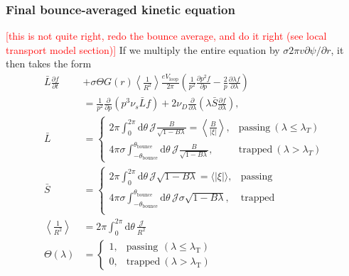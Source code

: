 \documentclass[11pt,a4paper]{article}
\newcommand{\rd}{\ensuremath{\mathrm{d}}}
\newcommand{\sub}[1]{\ensuremath{_{\text{#1}}}}
\begin{document}
\subsubsection*{Final bounce-averaged kinetic equation}
\textcolor{red}{[this is not quite right, redo the bounce average, and do it right (see local transport model section)]} If we multiply the entire equation by $\sigma 2\pi v \partial \psi/\partial r$, it then takes the form
\begin{align}
\bar{L}\frac{\partial f}{\partial t} &+ \sigma\Theta G(r) \left\langle\frac{1}{R^2}\right\rangle\frac{e V\sub{loop}}{2\pi}\left(\frac{1}{p^2}\frac{\partial  p^2 f}{\partial p} - \frac{2}{p}\frac{\partial \lambda f}{\partial \lambda} \right) \nonumber \\
&= \frac{1}{p^2}\frac{\partial}{\partial p}( p^3 \nu_s \bar{L}f) +  2\nu_D \frac{\partial}{\partial \lambda} \left(\lambda  \bar{S}\frac{\partial f}{\partial \lambda}\right), \\
\bar{L} &= \begin{cases}
2\pi \int_0^{2\pi} \rd \theta \,\mathcal{J}\frac{B}{\sqrt{1-B\lambda}} = \left\langle\frac{B}{|\xi|}\right\rangle, & \text{passing} ~ (\lambda \leq \lambda_T) \\
4\pi \sigma \int_{-\theta\sub{bounce}}^{\theta\sub{bounce}} \rd \theta \, \mathcal{J}\frac{B}{\sqrt{1-B\lambda}}, & \text{trapped}~(\lambda > \lambda_T)
\end{cases}\nonumber \\
\bar{S} &= \begin{cases}
2\pi \int_0^{2\pi} \rd \theta \,\mathcal{J} \sqrt{1-B\lambda}  = \langle |\xi| \rangle, & \text{passing} \\
4\pi\sigma \int_{-\theta\sub{bounce}}^{\theta\sub{bounce}} \rd \theta \,\mathcal{J}\sigma\sqrt{1-B\lambda}, & \text{trapped} \\
\end{cases}\nonumber \\
\left\langle\frac{1}{R^2}\right\rangle &= 2\pi \int_0^{2\pi} \rd\theta \, \frac{\mathcal{J}}{R^2} \nonumber \\
\Theta(\lambda) &= \begin{cases}
1, & \text{passing} ~ \, (\lambda \leq \lambda\sub{T}) \\
0, & \text{trapped} ~ (\lambda > \lambda\sub{T})
\end{cases}
\end{align}
\end{document}
